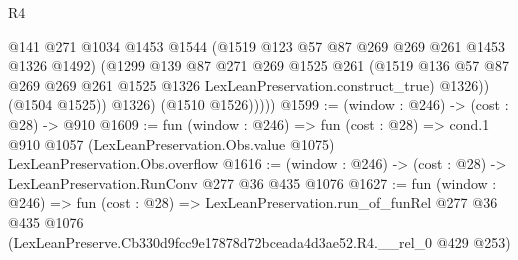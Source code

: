 \begin{lexlean}{R4}
\begin{coremodule}
                  @141
                  @271
                  @1034
                  @1453
                  @1544
                  (@1519 @123 @57 @87 @269 @269 @261 @1453 @1326 @1492)
                  (@1299
                    @139
                    @87
                    @271
                    @269
                    @1525
                    @261
                    (@1519
                      @136
                      @57
                      @87
                      @269
                      @269
                      @261
                      @1525
                      @1326
                      LexLeanPreservation.construct_true)
                    @1326))
                (@1504 @1525))
              @1326)
            (@1510 @1526)))))
@1599 := (window : @246) -> (cost : @28) -> @910
@1609 := fun (window : @246) =>
  fun (cost : @28) =>
  cond.{1} @910 @1057 (LexLeanPreservation.Obs.value @1075) LexLeanPreservation.Obs.overflow
@1616 := (window : @246) -> (cost : @28) -> LexLeanPreservation.RunConv @277 @36 @435 @1076
@1627 := fun (window : @246) =>
  fun (cost : @28) =>
  LexLeanPreservation.run_of_funRel
    @277
    @36
    @435
    @1076
    (LexLeanPreserve.Cb330d9fcc9e17878d72bceada4d3ae52.R4.__rel_0 @429 @253)
\end{coremodule}
\end{lexlean}
